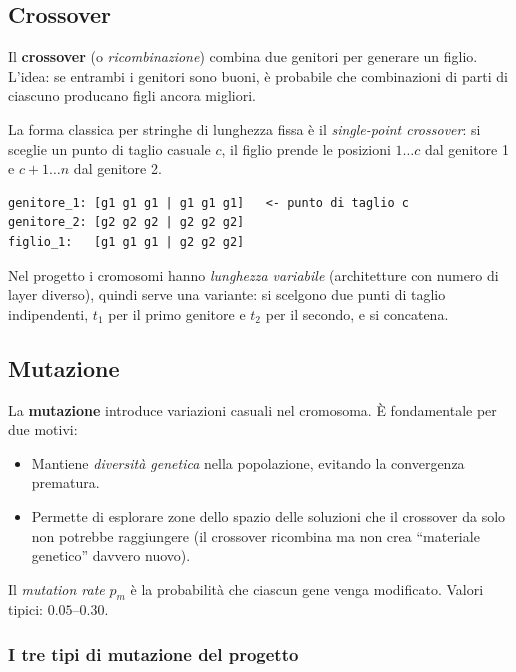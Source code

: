 \documentclass[11pt,a4paper]{article}
\begin{document}
\subsection{Crossover}

Il \textbf{crossover} (o \emph{ricombinazione}) combina due genitori per
generare un figlio. L'idea: se entrambi i genitori sono buoni, è probabile
che combinazioni di parti di ciascuno producano figli ancora migliori.

La forma classica per stringhe di lunghezza fissa è il \emph{single-point
crossover}: si sceglie un punto di taglio casuale $c$, il figlio prende
le posizioni $1\dots c$ dal genitore 1 e $c+1\dots n$ dal genitore 2.

\begin{verbatim}
genitore_1: [g1 g1 g1 | g1 g1 g1]   <- punto di taglio c
genitore_2: [g2 g2 g2 | g2 g2 g2]
figlio_1:   [g1 g1 g1 | g2 g2 g2]
\end{verbatim}

Nel progetto i cromosomi hanno \emph{lunghezza variabile} (architetture
con numero di layer diverso), quindi serve una variante: si scelgono due
punti di taglio indipendenti, $t_1$ per il primo genitore e $t_2$ per il
secondo, e si concatena.

\subsection{Mutazione}

La \textbf{mutazione} introduce variazioni casuali nel cromosoma. È
fondamentale per due motivi:
\begin{itemize}
    \item Mantiene \emph{diversità genetica} nella popolazione, evitando
          la convergenza prematura.
    \item Permette di esplorare zone dello spazio delle soluzioni che il
          crossover da solo non potrebbe raggiungere (il crossover ricombina
          ma non crea ``materiale genetico'' davvero nuovo).
\end{itemize}

Il \emph{mutation rate} $p_m$ è la probabilità che ciascun gene venga
modificato. Valori tipici: $0.05$--$0.30$.

\subsubsection{I tre tipi di mutazione del progetto}
\end{document}
